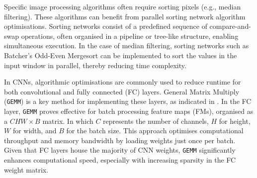 
Specific image processing algorithms often require sorting pixels (e.g., median filtering). These algorithms can benefit from parallel sorting network algorithm optimisations. Sorting networks consist of a predefined sequence of compare-and-swap operations, often organised in a pipeline or tree-like structure, enabling simultaneous execution. In the case of median filtering, sorting networks such as Batcher's Odd-Even Mergesort\cite{Bat68} can be implemented to sort the values in the input window in parallel, thereby reducing time complexity\cite{KimKimSun15}. 

In CNNs, algorithmic optimisations are commonly used to reduce runtime for both convolutional and fully connected (FC) layers. General Matrix Multiply (\texttt{GEMM}) is a key method for implementing these layers, as indicated in \cite{KimNamJun17,CheDiJai16}. In the FC layer, \texttt{GEMM} proves effective for batch processing feature maps (FMs), organised as a \( CHW \times B \) matrix. In which \( C \) represents the number of channels, \( H \) for height, \( W \) for width, and \( B \) for the batch size. This approach optimises computational throughput and memory bandwidth by loading weights just once per batch. Given that FC layers house the majority of CNN weights, \texttt{GEMM} significantly enhances computational speed, especially with increasing sparsity in the FC weight matrix. 




